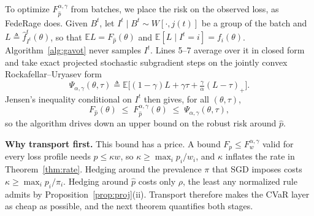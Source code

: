 \documentclass{article}
\theoremstyle{definition}
\newcommand{\E}{\mathbb{E}}
\begin{document}
To optimize $F^{\alpha,\gamma}_{\hat p}$ from batches, we place the risk
on the observed loss, as \textsf{FedeRage} does. Given $B^t$, let
$I^t\mid B^t\sim W[\cdot,j(t)]$ be a group of the batch and
$L\triangleq\hat f^t_{I^t}(\theta)$, so that $\E L=F_{\hat p}(\theta)$ and
$\E[L\mid I^t=i]=f_i(\theta)$. Algorithm~\ref{alg:gavot} never samples
$I^t$. Lines 5--7 average over it in closed form and take exact projected
stochastic subgradient steps on the jointly convex Rockafellar--Uryasev
form \cite{rockafellar2000cvar}
\begin{equation}
\Psi_{\alpha,\gamma}(\theta,\tau)\triangleq
\E\big[(1-\gamma)L+\gamma\tau+\tfrac{\gamma}{\alpha}(L-\tau)_+\big].
\label{eq:psi}
\end{equation}
Jensen's inequality conditional on $I^t$ then gives, for all
$(\theta,\tau)$,
\begin{equation}
F_{\hat p}(\theta)\;\le\;F^{\alpha,\gamma}_{\hat p}(\theta)\;\le\;\Psi_{\alpha,\gamma}(\theta,\tau),
\label{eq:sandwich}
\end{equation}
so the algorithm drives down an upper bound on the robust risk around
$\hat p$.

\noindent\textbf{Why transport first.} This bound has a price. A bound
$F_p\le F^{\alpha,\gamma}_w$ valid for every loss profile needs
$p\le\kappa w$, so $\kappa\ge\max_ip_i/w_i$, and $\kappa$ inflates the
rate in Theorem~\ref{thm:rate}. Hedging around the prevalence $\pi$ that
SGD imposes costs $\kappa\ge\max_ip_i/\pi_i$. Hedging around $\hat p$
costs only $\rho$, the least any normalized rule admits by
Proposition~\ref{prop:proj}(ii). Transport therefore makes the CVaR layer
as cheap as possible, and the next theorem quantifies both stages.
\end{document}
